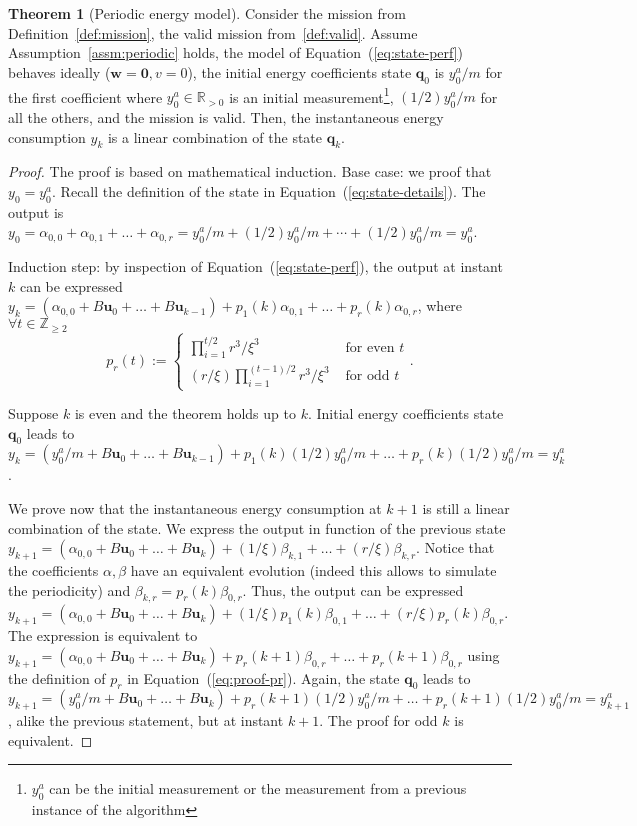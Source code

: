 \documentclass[letterpaper,10pt,conference]{ieeeconf}
\theoremstyle{definition}
\newtheorem{thm}{Theorem}[section]
\begin{document}
\begin{thm}[Periodic energy model]\label{thm:state-vs-energy}
  Consider the mission from Definition~\ref{def:mission}, the valid mission from~\ref{def:valid}. Assume Assumption~\ref{assm:periodic} holds, the model of Equation~(\ref{eq:state-perf}) behaves ideally ($\mathbf{w}=\mathbf{0},v=0$), the initial energy coefficients state $\mathbf{q}_0$ is $y_0^a/m$ for the first coefficient where $y_0^a\in\mathbb{R}_{>0}$ is an initial measurement\footnote{$y_0^a$ can be the initial measurement or the measurement from a previous instance of the algorithm}, $(1/2)y_0^a/m$ for all the others, and the mission is valid.
  Then, the instantaneous energy consumption $y_k$ is a linear combination of the state $\mathbf{q}_k$.
\end{thm}
\begin{proof}
  The proof is based on mathematical induction. 
  Base case: we proof that $y_0=y_0^a$. Recall the definition of the state in Equation~(\ref{eq:state-details}). The output is $y_{0}=\alpha_{0,0}+\alpha_{0,1}+\dots+\alpha_{0,r}=y_0^a/m+(1/2)y_0^a/m+\cdots+(1/2)y_0^a/m=y_0^a$.
  
  Induction step: by inspection of Equation~(\ref{eq:state-perf}), the output at instant $k$ can be expressed $y_{k}=(\alpha_{0,0}+B\mathbf{u}_0+\dots+B\mathbf{u}_{k-1})+p_1(k)\alpha_{0,1}+\dots+p_r(k)\alpha_{0,r}$, where $\forall t\in\mathbb{Z}_{\geq 2}$
  \begin{equation}\label{eq:proof-pr}
    p_r(t):=\begin{cases}
      \prod_{i=1}^{t/2}{r^3/\xi^3}&\text{ for even }t\\
      (r/\xi)\prod_{i=1}^{(t-1)/2}{r^3/\xi^3}&\text{ for odd }t
    \end{cases}.
  \end{equation}
  
  Suppose $k$ is even and the theorem holds up to $k$. Initial energy coefficients state $\mathbf{q}_0$ leads to $y_{k}=(y_0^a/m+B\mathbf{u}_0+\dots+B\mathbf{u}_{k-1})+p_1(k)(1/2)y_0^a/m+\dots+p_r(k)(1/2)y_0^a/m=y_{k}^a$. 
  
  We prove now that the instantaneous energy consumption at $k+1$ is still a linear combination of the state. We express the output in function of the previous state $y_{k+1}=(\alpha_{0,0}+B\mathbf{u}_0+\dots+B\mathbf{u}_{k})+(1/\xi)\beta_{k,1}+\dots+(r/\xi)\beta_{k,r}$. Notice that the coefficients $\alpha,\beta$ have an equivalent evolution (indeed this allows to simulate the periodicity) and $\beta_{k,r}=p_r(k)\beta_{0,r}$. Thus, the output can be expressed $y_{k+1}=(\alpha_{0,0}+B\mathbf{u}_0+\dots+B\mathbf{u}_{k})+(1/\xi)p_1(k)\beta_{0,1}+\dots+(r/\xi)p_r(k)\beta_{0,r}$. The expression is equivalent to $y_{k+1}=(\alpha_{0,0}+B\mathbf{u}_0+\dots+B\mathbf{u}_{k})+p_r(k+1)\beta_{0,r}+\dots+p_r(k+1)\beta_{0,r}$ using the definition of $p_r$ in Equation~(\ref{eq:proof-pr}). Again, the state $\mathbf{q}_0$ leads to $y_{k+1}=(y_0^a/m+B\mathbf{u}_0+\dots+B\mathbf{u}_{k})+p_r(k+1)(1/2)y_0^a/m+\dots+p_r(k+1)(1/2)y_0^a/m=y_{k+1}^a$, alike the previous statement, but at instant $k+1$. The proof for odd $k$ is equivalent.
\end{proof}
\end{document}
